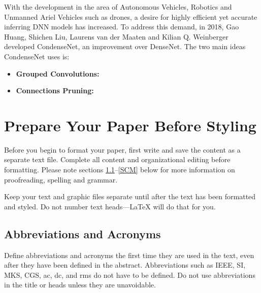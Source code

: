 \documentclass[conference]{IEEEtran}
\begin{document}
With the development in the area of Autonomous Vehicles, Robotics and Unmanned Ariel Vehicles such as drones, a desire for highly efficient yet accurate inferring DNN models has increased. To address this demand, in 2018, Gao Huang, Shichen Liu, Laurens van der Maaten and Kilian Q. Weinberger developed CondenseNet, an improvement over DenseNet.
The two main ideas CondenseNet uses is:
\begin{itemize}
    \item \textbf{Grouped Convolutions:} 
    \item \textbf{Connections Pruning:}
\end{itemize}













\section{\textbf{Prepare Your Paper Before Styling}}
Before you begin to format your paper, first write and save the content as a 
separate text file. Complete all content and organizational editing before 
formatting. Please note sections \ref{AA}--\ref{SCM} below for more information on 
proofreading, spelling and grammar.

Keep your text and graphic files separate until after the text has been 
formatted and styled. Do not number text heads---{\LaTeX} will do that 
for you.

\subsection{Abbreviations and Acronyms}\label{AA}
Define abbreviations and acronyms the first time they are used in the text, 
even after they have been defined in the abstract. Abbreviations such as 
IEEE, SI, MKS, CGS, ac, dc, and rms do not have to be defined. Do not use 
abbreviations in the title or heads unless they are unavoidable.
\end{document}
